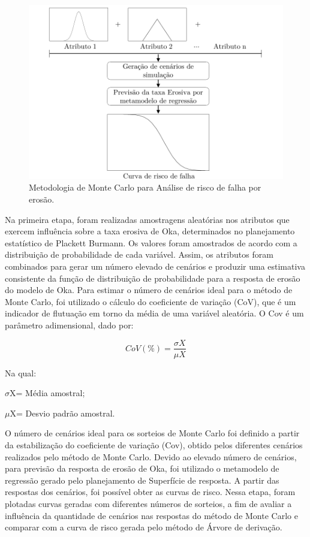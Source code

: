 \begin{figure}[H] 
    \centering  
    \includegraphics{Figuras/metodologiaMC.pdf}  
    \caption{Metodologia de Monte Carlo para Análise de risco de falha por erosão.}  
    \label{fig:montecarloflux}  
\end{figure}

Na primeira etapa, foram realizadas amostragens aleatórias nos atributos que exercem influência sobre a taxa erosiva de Oka, determinados no planejamento estatístico de Plackett Burmann. Os valores foram amostrados de acordo com a distribuição de probabilidade de cada variável. Assim, os atributos foram combinados para gerar um número elevado de cenários e produzir uma estimativa consistente da função de distribuição de probabilidade para a resposta de erosão do modelo de Oka. Para estimar o número de cenários ideal para o método de Monte Carlo, foi utilizado o cálculo do coeficiente de variação (CoV), que é um indicador de flutuação em torno da média de uma variável aleatória. O Cov é um parâmetro adimensional, dado por:

\begin{equation}
    CoV (\%) =  \frac{\sigma X}{\mu X}
\end{equation}

Na qual:

$\sigma$X= Média amostral;

$\mu$X= Desvio padrão amostral.

\vspace{0.3cm}

O número de cenários ideal para os sorteios de Monte Carlo foi definido a partir da estabilização do coeficiente de variação (Cov), obtido pelos diferentes cenários realizados pelo método de Monte Carlo. Devido ao elevado número de cenários, para previsão da resposta de erosão de Oka, foi utilizado o metamodelo de regressão gerado pelo planejamento de Superfície de resposta. A partir das respostas dos cenários, foi possível obter as curvas de risco. Nessa etapa, foram plotadas curvas geradas com diferentes números de sorteios, a fim de avaliar a influência da quantidade de cenários nas respostas do método de Monte Carlo e comparar com a curva de risco gerada pelo método de Árvore de derivação.






